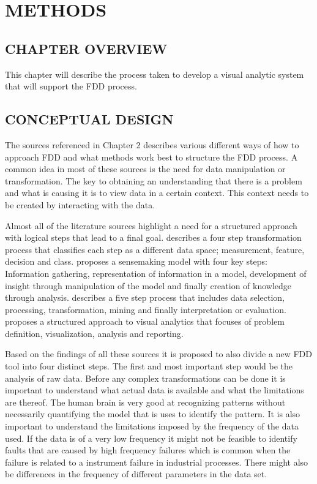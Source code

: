 
\chapter{METHODS}

\section{CHAPTER OVERVIEW}

This chapter will describe the process taken to develop a visual analytic system that will support the FDD process.

\section{CONCEPTUAL DESIGN}

The sources referenced in Chapter 2 describes various different ways of how to approach FDD and what methods work best to structure the FDD process. A common idea in most of these sources is the need for data manipulation or transformation. The key to obtaining an understanding that there is a problem and what is causing it is to  view data in a certain context. This context needs to be created by interacting with the data. 

Almost all of the literature sources highlight a need for a structured approach with logical steps that lead to a final goal. \cite{venkatasubramanian2003review} describes a four step transformation process that classifies each step as a different data space; measurement, feature, decision and class. \cite{pirolli2005sensemaking} proposes a sensemaking model with four key steps: Information gathering, representation of information in a model, development of insight through manipulation of the model and finally creation of knowledge through analysis. \cite{fayyad1996data} describes a five step process that includes data selection, processing, transformation, mining and finally interpretation or evaluation. \cite{mahyar2010closer} proposes a structured approach to visual analytics that focuses of problem definition, visualization, analysis and reporting.

Based on the findings of all these sources it is proposed to also divide a new FDD tool into four distinct steps. The first and most important step would be the analysis of raw data. Before any complex transformations can be done it is important to understand what actual data is available and what the limitations are thereof. The human brain is very good at recognizing patterns without necessarily quantifying the model that is uses to identify the pattern. It is also important to understand the limitations imposed by the frequency of the data used. If the data is of a very low frequency it might not be feasible to identify faults that are caused by high frequency failures which is common when the failure is related to a instrument failure in industrial processes. There might also be differences in the frequency of different parameters in the data set. 

